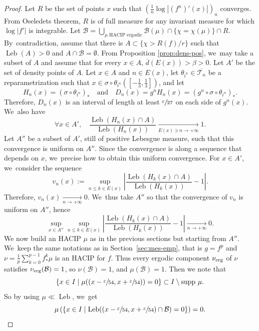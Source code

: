 \documentclass[JEP,XML,SOM,Unicode,NoFloatCountersInSection,published]{cedram}
\newcommand{\erg}{\textup{erg}}
\DeclareMathOperator{\Leb}{Leb}
\theoremstyle{definition}
\begin{document}
\begin{proof}
Let $R$ be the set of points $x$ such that $\left(\frac{1}{n} \log |(f^n)'(x)| \right)_n$ converges.
From Oseledets theorem, $R$ is of full measure for any invariant measure for which $\log |f'|$ is integrable.
Let $\mathcal{B} = \bigcup_{\mu \text{ HACIP ergodic}} \mathcal{B}(\mu) \cap \{ \chi = \chi(\mu) \} \cap R$. By~contradiction, assume that there is $A \subset \{ \chi > R(f)/r \}$ such that $\Leb(A) > 0$ and $A \cap \mathcal{B} = \emptyset$.
From Proposition \ref{prop:dens-pos}, we~may take a subset of $A$ and assume that for every $x \in A$, $\overline{d}(E(x)) > \beta > 0$.
Let $A'$ be the set of density points of $A$.
Let $x \in A$ and $n \in E(x)$, let $\theta_{i^n} \in \overline{\mathcal{T}_n}$ be a reparametrization such that $x \in \sigma \circ \theta_{i^n} \left (\left [ - \frac{1}{3}, \frac{1}{3} \right ] \right)$, and let
\[
H_n(x) = \left (\sigma \circ \theta_{i^n} \right)_* \quad \text{and} \quad D_n(x) = g^n H_n(x) = \left (g^n \circ \sigma \circ \theta_{i^n} \right)_*.
\]
Therefore, $D_n(x)$ is an interval of length at least $\sfrac{\varepsilon}{27}$ on each side of $g^n(x)$. We~also have
\[
\forall x \in A',\quad \frac{\Leb(H_n(x) \cap A)}{\Leb(H_n(x))} \underset{E(x) \ni n \to +\infty}{\longrightarrow} 1.
\]
Let $A''$ be a subset of $A'$, still of positive Lebesgue measure, such that this convergence is uniform on $A''$.
Since the convergence is along a sequence that depends on $x$, we~precise how to obtain this uniform convergence.
For $x \in A'$, we~consider the sequence
\[
v_n(x) := \sup_{n \leq k \in E(x)} \left | \frac{\Leb(H_k(x) \cap A)}{\Leb(H_k(x))} - 1 \right |.
\]
Therefore, $v_n(x) \underset{n \to +\infty}{\longrightarrow} 0$. We~thus take $A''$ so that the convergence of $v_n$ is uniform on $A''$, hence
\[
\sup_{x \in A''} \sup_{n \leq k \in E(x)} \left | \frac{\Leb(H_k(x) \cap A)}{\Leb(H_k(x))} - 1 \right | \underset{n \to +\infty}{\longrightarrow} 0.
\]
We now build an HACIP $\mu$ as in the previous sections but starting from $A''$. We~keep the same notations as in Section~\ref{sec:mes-emp}, that is $g=f^p$ and $\nu = \frac{1}{p} \sum_{k=0}^{p-1} f^k_* \mu$ is an HACIP for $f$.
Thus every ergodic component $\nu_{\erg}$ of $\nu$ satisfies $\nu_{\erg}(\mathcal{B}) = 1$, so $\nu(\mathcal{B})=1$, and $\mu(\mathcal{B}) = 1$.
Then we note that
\[
\{ x \in I \mid \mu((x - \sfrac{\varepsilon}{54}, x + \sfrac{\varepsilon}{54})) = 0 \} \subset I \setminus \text{supp } \mu.
\]
So by using $\mu \ll \Leb$, we~get
\[
\mu \left (\{ x \in I \mid \Leb((x - \sfrac{\varepsilon}{54}, x + \sfrac{\varepsilon}{54}) \cap \mathcal{B}) = 0 \} \right) = 0.
\]
\end{proof}
\end{document}
